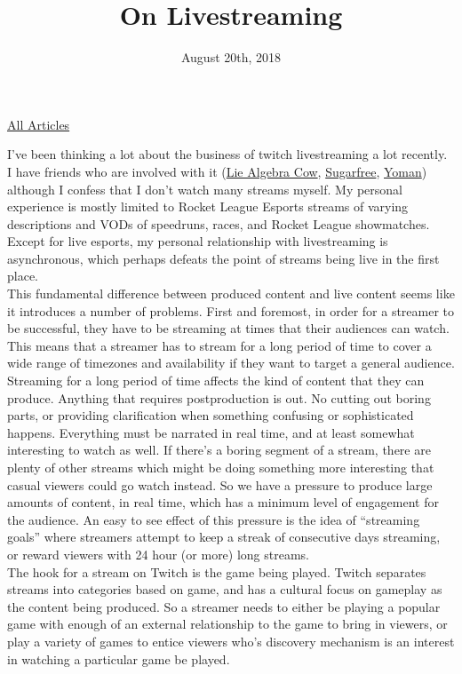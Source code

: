 \documentclass{article}
\title{On Livestreaming}
\date{August 20th, 2018}
\begin{document}
\maketitle
\begin{center}
  \href{../index.html}{All Articles}
\end{center}

I've been thinking a lot about the business of twitch livestreaming a lot recently. I have friends who are involved with it (\href{https://www.twitch.tv/liealgebracow}{Lie Algebra Cow}, \href{https://www.twitch.tv/sugarfree007}{Sugarfree}, \href{https://www.twitch.tv/yoman5}{Yoman}) although I confess that I don't watch many streams myself. My personal experience is mostly limited to Rocket League Esports streams of varying descriptions and VODs of speedruns, races, and Rocket League showmatches. Except for live esports, my personal relationship with livestreaming is asynchronous, which perhaps defeats the point of streams being live in the first place.\\

This fundamental difference between produced content and live content seems like it introduces a number of problems. First and foremost, in order for a streamer to be successful, they have to be streaming at times that their audiences can watch. This means that a streamer has to stream for a long period of time to cover a wide range of timezones and availability if they want to target a general audience. Streaming for a long period of time affects the kind of content that they can produce. Anything that requires postproduction is out. No cutting out boring parts, or providing clarification when something confusing or sophisticated happens. Everything must be narrated in real time, and at least somewhat interesting to watch as well. If there's a boring segment of a stream, there are plenty of other streams which might be doing something more interesting that casual viewers could go watch instead. So we have a pressure to produce large amounts of content, in real time, which has a minimum level of engagement for the audience. An easy to see effect of this pressure is the idea of ``streaming goals'' where streamers attempt to keep a streak of consecutive days streaming, or reward viewers with 24 hour (or more) long streams.\\ 

The hook for a stream on Twitch is the game being played. Twitch separates streams into categories based on game, and has a cultural focus on gameplay as the content being produced. So a streamer needs to either be playing a popular game with enough of an external relationship to the game to bring in viewers, or play a variety of games to entice viewers who's discovery mechanism is an interest in watching a particular game be played.\\
\end{document}
